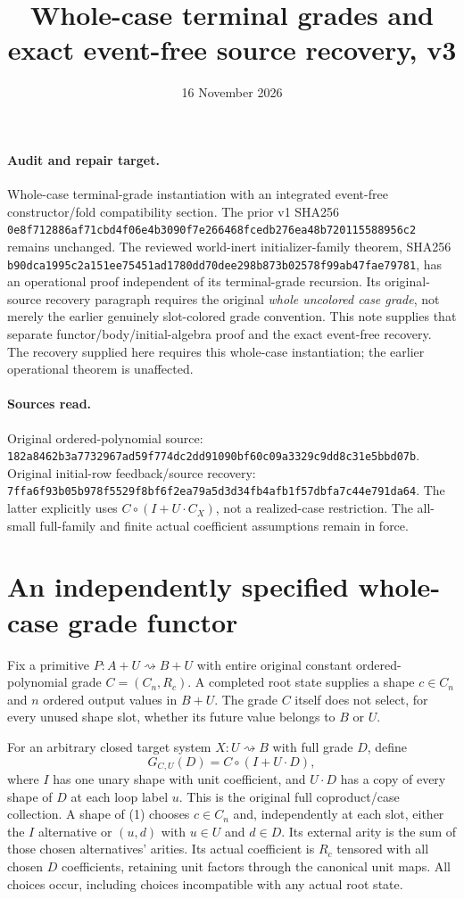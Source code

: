 \documentclass[11pt]{article}
\title{Whole-case terminal grades and exact event-free source recovery, v3}
\date{16 November 2026}
\begin{document}
\maketitle
\paragraph{Audit and repair target.} Whole-case terminal-grade instantiation with an integrated event-free constructor/fold compatibility section. The prior v1 SHA256 \texttt{0e8f712886af71cbd4f06e4b3090f7e266468fcedb276ea48b720115588956c2} remains unchanged. The reviewed world-inert initializer-family theorem, SHA256 \texttt{b90dca1995c2a151ee75451ad1780dd70dee298b873b02578f99ab47fae79781}, has an operational proof independent of its terminal-grade recursion. Its original-source recovery paragraph requires the original \emph{whole uncolored case grade}, not merely the earlier genuinely slot-colored grade convention. This note supplies that separate functor/body/initial-algebra proof and the exact event-free recovery. The recovery supplied here requires this whole-case instantiation; the earlier operational theorem is unaffected.

\paragraph{Sources read.} Original ordered-polynomial source: \texttt{182a8462b3a7732967ad59f774dc2dd91090bf60c09a3329c9dd8c31e5bbd07b}. Original initial-row feedback/source recovery: \texttt{7ffa6f93b05b978f5529f8bf6f2ea79a5d3d34fb4afb1f57dbfa7c44e791da64}. The latter explicitly uses $C\circ(I+U\cdot C_X)$, not a realized-case restriction. The all-small full-family and finite actual coefficient assumptions remain in force.

\section{An independently specified whole-case grade functor}
Fix a primitive $P:A+U\rightsquigarrow B+U$ with entire original constant ordered-polynomial grade $C=(C_n,R_c)$. A completed root state supplies a shape $c\in C_n$ and $n$ ordered output values in $B+U$. The grade $C$ itself does not select, for every unused shape slot, whether its future value belongs to $B$ or $U$.

For an arbitrary closed target system $X:U\rightsquigarrow B$ with full grade $D$, define
\[
 G_{C,U}(D)=C\circ(I+U\cdot D),                         \tag{1}
\]
where $I$ has one unary shape with unit coefficient, and $U\cdot D$ has a copy of every shape of $D$ at each loop label $u$. This is the original full coproduct/case collection. A shape of (1) chooses $c\in C_n$ and, independently at each slot, either the $I$ alternative or $(u,d)$ with $u\in U$ and $d\in D$. Its external arity is the sum of those chosen alternatives' arities. Its actual coefficient is $R_c$ tensored with all chosen $D$ coefficients, retaining unit factors through the canonical unit maps. All choices occur, including choices incompatible with any actual root state.
\end{document}
